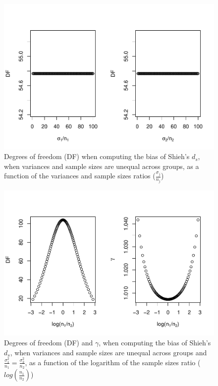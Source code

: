 \documentclass[
  man]{apa6}
\begin{document}
\begin{figure}
\centering
\includegraphics{Theoretical-Bias-of-all-estimators-as-a-function-of-population-parameters_files/figure-latex/biasshiehhetunbalSDRN2-1.pdf}
\caption{\label{fig:biasshiehhetunbalSDRN2}Degrees of freedom (DF) when computing the bias of Shieh's \(d_s\), when variances and sample sizes are unequal across groups, as a function of the variances and sample sizes ratios (\(\frac{\sigma_j}{n_j}\))}
\end{figure}

\begin{figure}
\centering
\includegraphics{Theoretical-Bias-of-all-estimators-as-a-function-of-population-parameters_files/figure-latex/biasshiehhetunbalSDRNandnpairing2case1-1.pdf}
\caption{\label{fig:biasshiehhetunbalSDRNandnpairing2case1}Degrees of freedom (DF) and \(\gamma\), when computing the bias of Shieh's \(d_s\), when variances and sample sizes are unequal across groups and \(\frac{\sigma^2_1}{n_1}=\frac{\sigma^2_2}{n_2}\), as a function of the logarithm of the sample sizes ratio (\(log \left( \frac{n_1}{n_2} \right)\))}
\end{figure}
\end{document}
